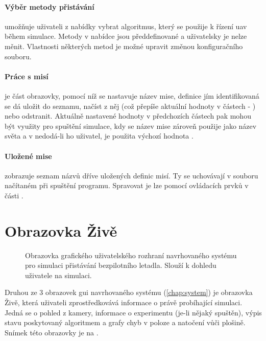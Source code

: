    \paragraph{ Výběr metody přistávání}umožňuje uživateli z nabídky vybrat algoritmus, který se použije k řízení \acrshort{uav} během simulace. Metody v nabídce jsou předdefinované a uživatelsky je nelze měnit. Vlastnosti některých metod je možné upravit změnou konfiguračního souboru.

    \paragraph{ Práce s misí} je část obrazovky, pomocí níž se nastavuje název mise, definice jím identifikovaná se dá uložit do seznamu, načíst z něj (což přepíše aktuální hodnoty v částech  - ) nebo odstranit. Aktuálně nastavené hodnoty v předchozích částech pak mohou být využity pro spuštění simulace, kdy se název mise zároveň použije jako název světa a v nedodá-li ho uživatel, je použita výchozí hodnota .

    \paragraph{ Uložené mise} zobrazuje seznam názvů dříve uložených definic misí. Ty se uchovávají v souboru načítaném při spuštění programu. Spravovat je lze pomocí ovládacích prvků v části .
    
    \section{Obrazovka Živě} \label{sec:zive}
        \begin{figure}
            \centering
            
            \caption[GUI: Obrazovka ]{Obrazovka  grafického uživatelského rozhraní navrhovaného systému pro simulaci přistávání bezpilotního letadla. Slouží k dohledu uživatele na simulaci.}
            \label{fig:tabZive}
        \end{figure}
        Druhou ze 3 obrazovek \acrshort{gui} navrhovaného systému (\cref{chap:system}) je obrazovka Živě, která uživateli zprostředkovává informace o právě probíhající simulaci. Jedná se o pohled z kamery, informace o experimentu (je-li nějaký spuštěn), výpis stavu poskytovaný algoritmem a grafy chyb v poloze a natočení vůči plošině. Snímek této obrazovky je na .

